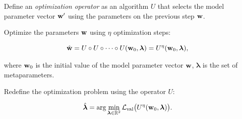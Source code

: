 \documentclass[runningheads]{llncs}
\begin{document}
\begin{definition} 
Define an \textit{optimization operator} as an algorithm $U$ that selects the model parameter vector $\mathbf{w}^\prime$ using the parameters on the previous step $\mathbf{w}$.
\end{definition}

Optimize the parameters $\mathbf{w}$ using $\eta$ optimization steps:

$$
    \hat{\mathbf{w}} = U \circ U \circ \dots \circ U(\mathbf{w}_0, \boldsymbol{\lambda}) = U^\eta(\mathbf{w}_0, \boldsymbol{\lambda}),
$$

\noindent
where $\mathbf{w}_0$ is the initial value of the model parameter vector $\mathbf{w}$, $\boldsymbol{\lambda}$ is the set of metaparameters.

Redefine the optimization problem using the operator $U$:

$$
    \hat{\boldsymbol{\lambda}} = \arg\min\limits_{\boldsymbol{\lambda} \in \mathbb{R}^2} \mathcal{L}_\text{val}\bigl(U^\eta(\mathbf{w}_0, \boldsymbol{\lambda})\bigr).
$$
\end{document}
